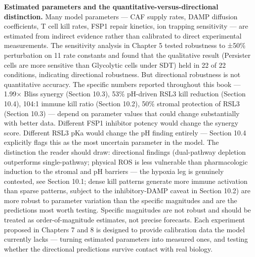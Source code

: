 \documentclass[11pt,twoside,openright]{report}
\begin{document}
\textbf{Estimated parameters and the quantitative-versus-directional distinction.} Many model parameters --- CAF supply rates, DAMP diffusion coefficients, T cell kill rates, FSP1 repair kinetics, ion trapping sensitivity --- are estimated from indirect evidence rather than calibrated to direct experimental measurements. The sensitivity analysis in Chapter 5 tested robustness to ±50\% perturbation on 11 rate constants and found that the qualitative result (Persister cells are more sensitive than Glycolytic cells under SDT) held in 22 of 22 conditions, indicating directional robustness. But directional robustness is not quantitative accuracy. The specific numbers reported throughout this book --- 1.99$\times$ Bliss synergy (Section 10.3), 53\% pH-driven RSL3 kill reduction (Section 10.4), 104:1 immune kill ratio (Section 10.2), 50\% stromal protection of RSL3 (Section 10.3) --- depend on parameter values that could change substantially with better data. Different FSP1 inhibitor potency would change the synergy score. Different RSL3 pKa would change the pH finding entirely --- Section 10.4 explicitly flags this as the most uncertain parameter in the model. The distinction the reader should draw: directional findings (dual-pathway depletion outperforms single-pathway; physical ROS is less vulnerable than pharmacologic induction to the stromal and pH barriers --- the hypoxia leg is genuinely contested, see Section 10.1; dense kill patterns generate more immune activation than sparse patterns, subject to the inhibitory-DAMP caveat in Section 10.2) are more robust to parameter variation than the specific magnitudes and are the predictions most worth testing. Specific magnitudes are not robust and should be treated as order-of-magnitude estimates, not precise forecasts. Each experiment proposed in Chapters 7 and 8 is designed to provide calibration data the model currently lacks --- turning estimated parameters into measured ones, and testing whether the directional predictions survive contact with real biology.
\end{document}
